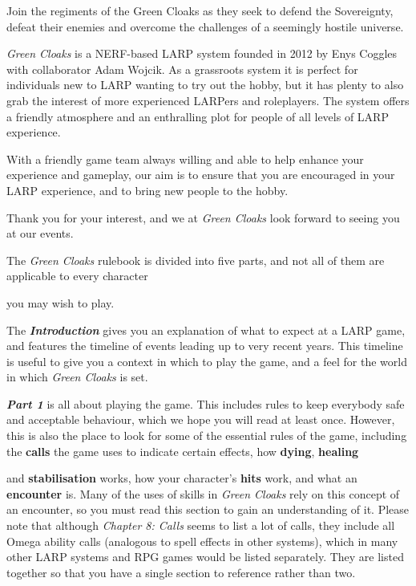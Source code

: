 \documentclass{scrbook}
\begin{document}
Join the regiments of the Green Cloaks as they seek to defend the Sovereignty, defeat their enemies and overcome the challenges of a seemingly hostile universe.

\textit{Green Cloaks} is a NERF-based LARP system founded in 2012 by Enys Coggles with collaborator Adam Wojcik. As a grassroots system it is perfect for individuals new to LARP wanting to try out the hobby, but it has plenty to also grab the interest of more experienced LARPers and roleplayers. The system offers a friendly atmosphere and an enthralling plot for people of all levels of LARP experience.

With a friendly game team always willing and able to help enhance your experience and gameplay, our aim is to ensure that you are encouraged in your LARP experience, and to bring new people to the hobby.

Thank you for your interest, and we at \textit{Green Cloaks} look forward to seeing you at our events.

The \textit{Green Cloaks} rulebook is divided into five parts, and not all of them are applicable to every character

you may wish to play.

The \textbf{\textit{Introduction}} gives you an explanation of what to expect at a LARP game, and features the timeline of events leading up to very recent years. This timeline is useful to give you a context in which to play the game, and a feel for the world in which \textit{Green Cloaks} is set.

\textbf{\textit{Part 1}} is all about playing the game. This includes rules to keep everybody safe and acceptable behaviour, which we hope you will read at least once. However, this is also the place to look for some of the essential rules of the game, including the \textbf{calls} the game uses to indicate certain effects, how \textbf{dying}, \textbf{healing}

and \textbf{stabilisation} works, how your character's \textbf{hits} work, and what an \textbf{encounter} is. Many of the uses of skills in \textit{Green Cloaks} rely on this concept of an encounter, so you must read this section to gain an understanding of it. Please note that although \textit{Chapter 8: Calls} seems to list a lot of calls, they include all Omega ability calls (analogous to spell effects in other systems), which in many other LARP systems and RPG games would be listed separately. They are listed together so that you have a single section to reference rather than two.
\end{document}
